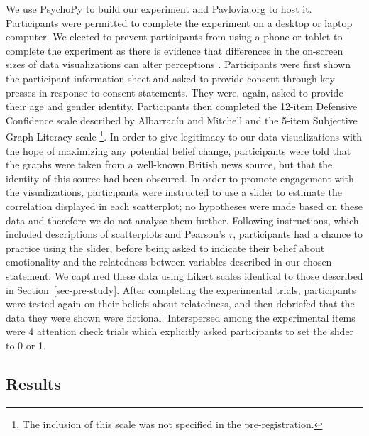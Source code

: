 \documentclass[manuscript,screen,review,anonymous]{acmart}
\begin{document}
We use PsychoPy \citep{pierce_2019} to build our experiment and
Pavlovia.org to host it. Participants were permitted to complete the
experiment on a desktop or laptop computer. We elected to prevent
participants from using a phone or tablet to complete the experiment as
there is evidence that differences in the on-screen sizes of data
visualizations can alter perceptions \citep{cleveland_1982}.
Participants were first shown the participant information sheet and
asked to provide consent through key presses in response to consent
statements. They were, again, asked to provide their age and gender
identity. Participants then completed the 12-item Defensive Confidence
scale described by Albarracín and Mitchell \citep{albarracin_2004} and
the 5-item Subjective Graph Literacy scale \citep{garcia_2016}
\footnote{The inclusion of this scale was not specified in the
  pre-registration.}. In order to give legitimacy to our data
visualizations with the hope of maximizing any potential belief change,
participants were told that the graphs were taken from a well-known
British news source, but that the identity of this source had been
obscured. In order to promote engagement with the visualizations,
participants were instructed to use a slider to estimate the correlation
displayed in each scatterplot; no hypotheses were made based on these
data and therefore we do not analyse them further. Following
instructions, which included descriptions of scatterplots and Pearson's
\emph{r}, participants had a chance to practice using the slider, before
being asked to indicate their belief about emotionality and the
relatedness between variables described in our chosen statement. We
captured these data using Likert scales identical to those described in
Section~\ref{sec-pre-study}. After completing the experimental trials,
participants were tested again on their beliefs about relatedness, and
then debriefed that the data they were shown were fictional.
Interspersed among the experimental items were 4 attention check trials
which explicitly asked participants to set the slider to 0 or 1.

\subsection{Results}\label{sec-results-main}
\end{document}
